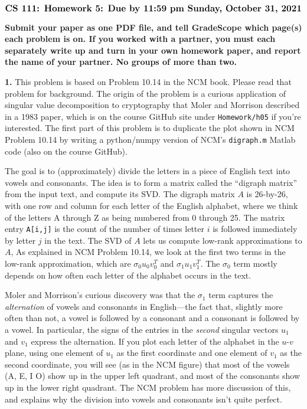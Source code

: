 \documentclass[11pt]{article}
\begin{document}
$$\mbox{\Large \bf CS 111: Homework 5: Due by 11:59 pm Sunday, October 31, 2021}$$
\par\smallskip\noindent
{\bf Submit your paper as one PDF file,
and tell GradeScope which page(s) each problem is on.
If you worked with a partner, 
you must each separately write up and turn in your own homework paper, 
and report the name of your partner.
No groups of more than two.
}

\par\bigskip
{\bf 1.}
This problem is based on Problem 10.14 in the NCM book.
Please read that problem for background.
The origin of the problem is a curious application of singular value decomposition
to cryptography that Moler and Morrison described in a 1983 paper,
which is on the course GitHub site under {\tt Homework/h05} if you're interested.
The first part of this problem is to duplicate the plot shown in NCM Problem 10.14
by writing a python/numpy version of NCM's {\tt digraph.m} Matlab code 
(also on the course GitHub).

The goal is to (approximately) divide the letters in a piece of English text 
into vowels and consonants.
The idea is to form a matrix called the ``digraph matrix'' from the input text,
and compute its SVD.
The digraph matrix $A$ is 26-by-26, with one row and column for each letter of the
English alphabet,
where we think of the letters A through Z as being numbered from 0 through 25.
The matrix entry {\tt A[i,j]} is the count of the number of times letter $i$
is followed immediately by letter $j$ in the text.
The SVD of $A$ lets us compute low-rank approximations to $A$,
As explained in NCM Problem 10.14, we look at the first two terms in the low-rank approximation, 
which are $\sigma_0u_0v_0^T$ and $\sigma_1u_1v_1^T$.
The $\sigma_0$ term mostly depends on how often each letter of the alphabet occurs in the text.

Moler and Morrison's curious discovery was
that the $\sigma_1$ term captures the {\em alternation} of vowels and consonants in English---the
fact that, slightly more often than not, a vowel is followed by a consonant and a consonant is
followed by a vowel.
In particular, the signs of the entries in the {\em second} singular vectors $u_1$ and $v_1$ 
express the alternation.
If you plot each letter of the alphabet in the $u$-$v$ plane,
using one element of $u_1$ as the first coordinate and one element of $v_1$
as the second coordinate,
you will see (as in the NCM figure) that most of the vowels (A, E, I O) show up in the
upper left quadrant, and most of the consonants show up in the lower right quadrant.
The NCM problem has more discussion of this, and explains why the division into
vowels and consonants isn't quite perfect.
\end{document}
